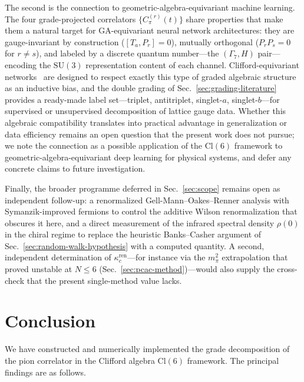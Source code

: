 \documentclass[12pt]{article}
\theoremstyle{definition}
\theoremstyle{remark}
\newcommand{\cl}{\mathrm{Cl}}           %
\newcommand{\su}{\mathrm{SU}}           %
\newcommand{\kcren}{\kappa_{c}^{\mathrm{ren}}}      %
\newcommand{\GaSeven}{\Gamma_7}                      %
\begin{document}
	The second is the connection to geometric-algebra-equivariant machine learning.
	The four grade-projected correlators $\{C_\pi^{(r)}(t)\}$ share properties
	that make them a natural target for GA-equivariant neural network architectures:
	they are gauge-invariant by construction ($[T_a,P_r]=0$), mutually orthogonal
	($P_rP_s=0$ for $r\neq s$), and labeled by a discrete quantum number---the
	$(\GaSeven,H)$ pair---encoding the $\su(3)$ representation content of each
	channel.  Clifford-equivariant
	networks~\cite{Ruhe2023a,Brehmer2023,Brehmer2024,Ruhe2024} are designed to
	respect exactly this type of graded algebraic structure as an inductive bias,
	and the double grading of Sec.~\ref{sec:grading-literature} provides a
	ready-made label set---triplet, antitriplet, singlet-$a$, singlet-$b$---for
	supervised or unsupervised decomposition of lattice gauge data.  Whether this
	algebraic compatibility translates into practical advantage in generalization
	or data efficiency remains an open question that the present work does not
	pursue; we note the connection as a possible application of the $\cl(6)$
	framework to geometric-algebra-equivariant deep learning for physical systems,
	and defer any concrete claims to future investigation.
		
		Finally, the broader programme deferred in Sec.~\ref{sec:scope} remains open as
		independent follow-up: a renormalized Gell-Mann--Oakes--Renner analysis with
		Symanzik-improved fermions to control the additive Wilson renormalization that
		obscures it here, and a direct measurement of the infrared spectral density
		$\rho(0)$ in the chiral regime to replace the heuristic Banks--Casher argument
		of Sec.~\ref{sec:random-walk-hypothesis} with a computed quantity.  A second,
		independent determination of $\kcren$---for instance via the $m_\pi^2$
		extrapolation that proved unstable at $N\le6$ (Sec.~\ref{sec:pcac-method})---would
		also supply the cross-check that the present single-method value lacks.
	
	\section{Conclusion}
	\label{sec:conclusion}
	
	We have constructed and numerically implemented the grade decomposition of
	the pion correlator in the Clifford algebra $\cl(6)$ framework.  The
	principal findings are as follows.
	
\end{document}
